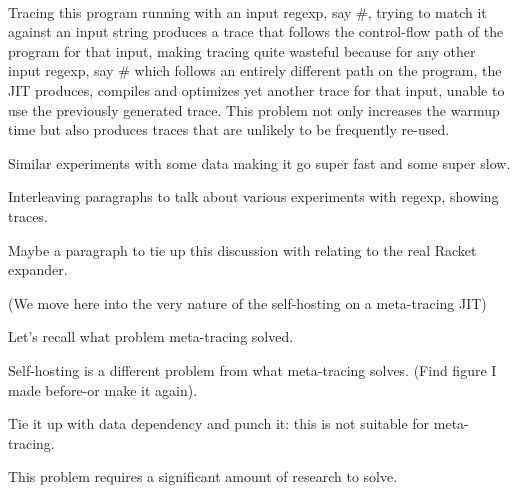 			\paragraph{}%
			Tracing this program running with an input regexp, say
			$\mathtt{\#}$, trying to match it against an
			input string produces a trace that follows the control-flow path of
			the program for that input, making tracing quite wasteful because for
			any other input regexp, say $\mathtt{\#}$ which
			follows an entirely different path on the program, the JIT produces,
			compiles and optimizes yet another trace for that input, unable to use
			the previously generated trace. This problem not only increases the
			warmup time but also produces traces that are unlikely to be
			frequently re-used.

			\begin{show-experiment}
				Similar experiments with some data making it go super fast and some super slow.
			\end{show-experiment}

			\begin{paragraph-here}
				Interleaving paragraphs to talk about various experiments with regexp, showing traces.
			\end{paragraph-here}

			\begin{paragraph-here}
				Maybe a paragraph to tie up this discussion with relating to the real Racket expander.
			\end{paragraph-here}

			(We move here into the very nature of the self-hosting on a meta-tracing JIT)

			\begin{paragraph-here}
				Let's recall what problem meta-tracing solved.
			\end{paragraph-here}

			\begin{paragraph-here}
				Self-hosting is a different problem from what meta-tracing solves. (Find figure I made before-or make it again).
			\end{paragraph-here}

			\begin{paragraph-here}
				Tie it up with data dependency and punch it: this is not suitable for meta-tracing.
			\end{paragraph-here}

			\begin{paragraph-here}
				This problem requires a significant amount of research to solve.
			\end{paragraph-here}


